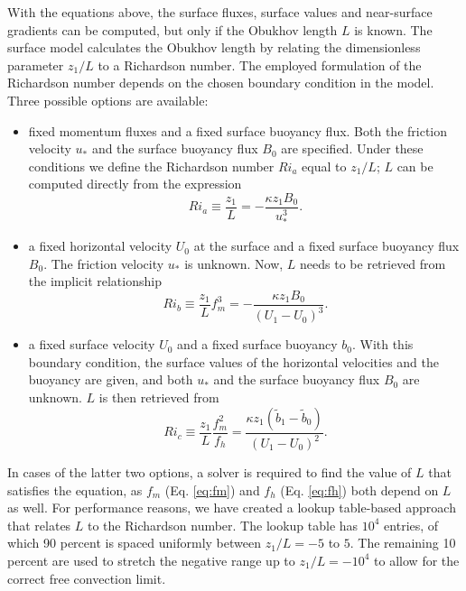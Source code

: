 \documentclass[gmd,manuscript]{copernicus}
\begin{document}
With the equations above, the surface fluxes, surface values and near-surface gradients can be computed, but only if the Obukhov length $L$ is known. The surface model calculates the Obukhov length by relating the dimensionless parameter $z_1/ L$ to a Richardson number. The employed formulation of the Richardson number depends on the chosen boundary condition in the model. Three possible options are available:
\begin{itemize}
	\item fixed momentum fluxes and a fixed surface buoyancy flux. Both the friction velocity $u_*$ and the surface buoyancy flux $B_0$ are specified. Under these conditions we define the Richardson number $Ri_a$ equal to $z_1/L$; $L$ can be computed directly from the expression
	\begin{equation}
	Ri_a \equiv \dfrac{z_1}{L} = - \dfrac{\kappa z_1 B_0}{u_*^3}.
	\end{equation}
	\item a fixed horizontal velocity $U_0$ at the surface and a fixed surface buoyancy flux $B_0$. The friction velocity $u_*$ is unknown. Now,  $L$ needs to be retrieved from the implicit relationship 
	\begin{equation}
	Ri_b \equiv \dfrac{z_1}{L} f_m^3 = - \dfrac{\kappa z_1 B_0}{ \left(U_1 - U_0 \right)^3}.
	\end{equation}
	\item a fixed surface velocity $U_0$ and a fixed surface buoyancy $b_0$. With this boundary condition, the surface values of the horizontal velocities and the buoyancy are given, and both $u_*$ and the surface buoyancy flux $B_0$ are unknown. $L$ is then retrieved from
	\begin{equation}
	Ri_c \equiv \dfrac{z_1}{L} \dfrac{f_m^2}{f_h} = \dfrac{\kappa z_1 \left(\widetilde{b}_1 - \widetilde{b}_0 \right)}{ \left(U_1 - U_0 \right)^2}.
	\end{equation}
\end{itemize}
In cases of the latter two options, a solver is required to find the value of $L$ that satisfies the equation, as $f_m$ (Eq. \ref{eq:fm}) and $f_h$ (Eq.  \ref{eq:fh}) both depend on $L$ as well. For performance reasons, we have created a lookup table-based approach that relates $L$ to the Richardson number. The lookup table has $10^4$ entries, of which 90 percent is spaced uniformly between $z_1/L = -5$ to $5$. The remaining 10 percent are used to stretch the negative range up to $z_1/L = -10^4$ to allow for the correct free convection limit. 
\end{document}

